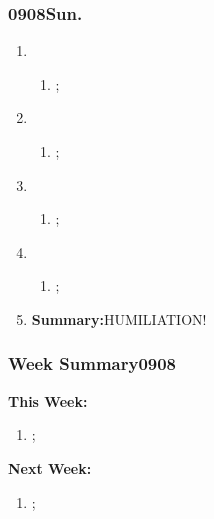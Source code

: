 \subsubsection{0908Sun.}
\begin{enumerate}
	\item \ncquaone
	\begin{enumerate}[(1)]
		\item;\rightundoneBlack
	\end{enumerate}
	
	\item \ncquatwo	
	\begin{enumerate}[(1)]
		\item ;\rightundone
	\end{enumerate}
	
	\item \ncquathree
	\begin{enumerate}[(1)]
		\item ;\rightundone
	\end{enumerate}
	
	\item \ncquafour	
	\begin{enumerate}[(1)]
		\item ;\rightundoneBlack
	\end{enumerate}
	\item \textbf{Summary:}HUMILIATION! 
\end{enumerate}
\subsubsection{Week Summary0908}	 
{\setlength{\parindent}{0pt}\textbf{This Week:}}
\begin{enumerate}
	\item ;
\end{enumerate}
\textbf{Next Week:}
\begin{enumerate}
	\item ;	
\end{enumerate}